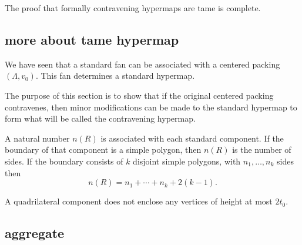 The proof that formally contravening hypermaps are tame is complete.

\subsection{more about tame hypermap}

We have seen that a standard fan
can be associated with a centered packing $(\Lambda,v_0)$. 
This fan determines a standard hypermap.

The purpose of this section is to show that if the original
centered packing contravenes, then minor modifications can be made
to the standard hypermap to form what will be called the contravening
hypermap.

A natural number $n(R)$ is associated with each standard component. If
the boundary of that component is a simple polygon, then $n(R)$ is the
number of sides.   If the boundary consists of $k$ disjoint simple
polygons, with $n_1,\ldots,n_k$ sides then
    $$n(R) = n_1+\cdots+n_k + 2(k-1).$$


\begin{lemma}\label{lemma:enclosed:bis} %
A quadrilateral component does not enclose any vertices of height at
most $2t_0$.
\end{lemma}








\subsection{aggregate}
\label{sec:stargraph}

